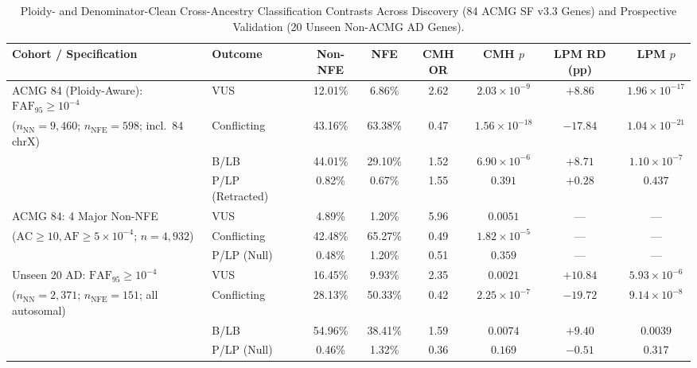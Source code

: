 \documentclass[11pt,letterpaper]{article}
\begin{document}
\begin{table}[H]
\centering
\caption{Ploidy- and Denominator-Clean Cross-Ancestry Classification Contrasts Across Discovery (84 ACMG SF v3.3 Genes) and Prospective Validation (20 Unseen Non-ACMG AD Genes).}
\label{tab:a1_h1}
\scriptsize
\setlength{\tabcolsep}{2pt}
\begin{tabularx}{\textwidth}{>{\raggedright\arraybackslash}X l c c c c c c}
\toprule
\textbf{Cohort / Specification} & \textbf{Outcome} & \textbf{Non-NFE} & \textbf{NFE} & \textbf{CMH OR} & \textbf{CMH $p$} & \textbf{LPM RD (pp)} & \textbf{LPM $p$} \\
\midrule
ACMG 84 (Ploidy-Aware): $\mathrm{FAF}_{95}\ge 10^{-4}$ & VUS & 12.01\% & 6.86\% & 2.62 & $2.03\times 10^{-9}$ & $+8.86$ & $1.96\times 10^{-17}$ \\
($n_{\text{NN}}=9,460$; $n_{\text{NFE}}=598$; incl.\ 84 chrX) & Conflicting & 43.16\% & 63.38\% & 0.47 & $1.56\times 10^{-18}$ & $-17.84$ & $1.04\times 10^{-21}$ \\
 & B/LB & 44.01\% & 29.10\% & 1.52 & $6.90\times 10^{-6}$ & $+8.71$ & $1.10\times 10^{-7}$ \\
 & P/LP (Retracted) & 0.82\% & 0.67\% & 1.55 & $0.391$ & $+0.28$ & $0.437$ \\
\midrule
ACMG 84: 4 Major Non-NFE & VUS & 4.89\% & 1.20\% & 5.96 & $0.0051$ & --- & --- \\
($\mathrm{AC}\ge 10, \mathrm{AF}\ge 5\times 10^{-4}$; $n=4,932$) & Conflicting & 42.48\% & 65.27\% & 0.49 & $1.82\times 10^{-5}$ & --- & --- \\
 & P/LP (Null) & 0.48\% & 1.20\% & 0.51 & $0.359$ & --- & --- \\
\midrule
Unseen 20 AD: $\mathrm{FAF}_{95}\ge 10^{-4}$ & VUS & 16.45\% & 9.93\% & 2.35 & $0.0021$ & $+10.84$ & $5.93\times 10^{-6}$ \\
($n_{\text{NN}}=2,371$; $n_{\text{NFE}}=151$; all autosomal) & Conflicting & 28.13\% & 50.33\% & 0.42 & $2.25\times 10^{-7}$ & $-19.72$ & $9.14\times 10^{-8}$ \\
 & B/LB & 54.96\% & 38.41\% & 1.59 & $0.0074$ & $+9.40$ & $0.0039$ \\
 & P/LP (Null) & 0.46\% & 1.32\% & 0.36 & $0.169$ & $-0.51$ & $0.317$ \\
\bottomrule
\end{tabularx}
\end{table}
\end{document}
